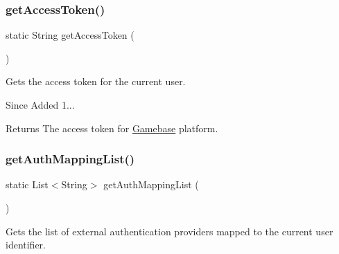 \subsubsection{\texorpdfstring{get\+Access\+Token()}{getAccessToken()}}
{\footnotesize\ttfamily static String get\+Access\+Token (\begin{DoxyParamCaption}{ }\end{DoxyParamCaption})\hspace{0.3cm}{\ttfamily [static]}}



Gets the access token for the current user. 

\begin{DoxySince}{Since}
Added 1... 
\end{DoxySince}
\begin{DoxyReturn}{Returns}
The access token for \hyperlink{classcom_1_1toast_1_1android_1_1gamebase_1_1_gamebase}{Gamebase} platform. 
\end{DoxyReturn}
\mbox{\label{classcom_1_1toast_1_1android_1_1gamebase_1_1_gamebase_abc355ef4a49b5c6348ee31890df16431}} 
\subsubsection{\texorpdfstring{get\+Auth\+Mapping\+List()}{getAuthMappingList()}}
{\footnotesize\ttfamily static List$<$String$>$ get\+Auth\+Mapping\+List (\begin{DoxyParamCaption}{ }\end{DoxyParamCaption})\hspace{0.3cm}{\ttfamily [static]}}



Gets the list of external authentication providers mapped to the current user identifier. 

